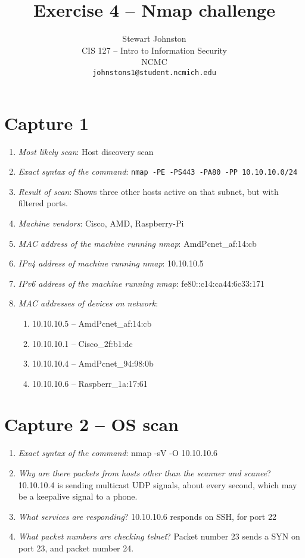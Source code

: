 \documentclass{article}
\title{Exercise 4 -- Nmap challenge}
\author{Stewart Johnston\\
  {CIS 127 -- Intro to Information Security}\\
  {NCMC}\\
  {\texttt{johnstons1@student.ncmich.edu}}
}
\date{}
\begin{document}
\maketitle

\section{Capture 1}
\begin{enumerate}
	\item {\em Most likely scan}: Host discovery scan
	\item {\em Exact syntax of the command}: \verb|nmap -PE -PS443 -PA80 -PP 10.10.10.0/24|
	\item {\em Result of scan}: Shows three other hosts active on that
			subnet, but with filtered ports.
		\item {\em Machine vendors}: Cisco, AMD, Raspberry-Pi
		\item {\em MAC address of the machine running nmap}: AmdPcnet\_af:14:cb
		\item {\em IPv4 address of machine running nmap}: 10.10.10.5
		\item {\em IPv6 address of the machine running nmap}: fe80::c14:ca44:6c33:171
		\item {\em MAC addresses of devices on network}:
		\begin{enumerate}
			\item 10.10.10.5 -- AmdPcnet\_af:14:cb
			\item 10.10.10.1 -- Cisco\_2f:b1:dc
			\item 10.10.10.4 -- AmdPcnet\_94:98:0b
			\item 10.10.10.6 -- Raspberr\_1a:17:61
		\end{enumerate}
\end{enumerate}

\section{Capture 2 -- OS scan}
\begin{enumerate}
	\item {\em Exact syntax of the command}: nmap -sV -O 10.10.10.6
	\item {\em Why are there packets from hosts other than the scanner and
		scanee}? 10.10.10.4 is sending multicast UDP signals, about
		every second, which may be a keepalive signal to a phone.
	\item {\em What services are responding}? 10.10.10.6 responds on SSH, for port 22
	\item {\em What packet numbers are checking telnet}? Packet number 23 sends a SYN on port 23, and packet number 24.
\end{enumerate}
\end{document}
